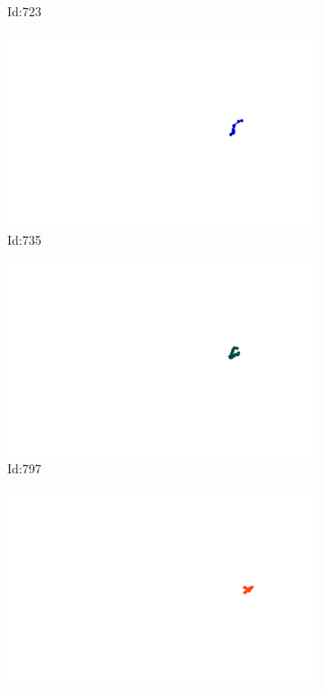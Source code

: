 \documentclass[12pt,twoside]{report}
\begin{document}
\begin{figure}
\begin{subfigure}[b]{0.20\textwidth}
\caption{Id:723}
\end{subfigure}
\begin{subfigure}[b]{0.20\textwidth}
\centering
\includegraphics[width=\textwidth]{../trajectories/735.png}
\caption{Id:735}
\end{subfigure}
\begin{subfigure}[b]{0.20\textwidth}
\centering
\includegraphics[width=\textwidth]{../trajectories/797.png}
\caption{Id:797}
\end{subfigure}
\begin{subfigure}[b]{0.20\textwidth}
\centering
\includegraphics[width=\textwidth]{../trajectories/807.png}

\end{subfigure}
\end{figure}
\end{document}
